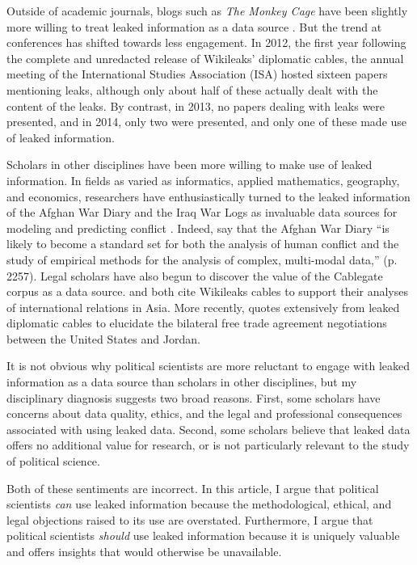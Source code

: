 \documentclass[12pt]{article}
\begin{document}
Outside of academic journals, blogs such as \textit{The Monkey Cage} have been slightly more willing 
to treat leaked information as a data source \citep{voeten2010wikileaks,michael2013united}.
But the trend at conferences has shifted towards less engagement. In 2012, the first year following the 
complete and unredacted release of Wikileaks' diplomatic cables, the annual meeting of the International Studies 
Association (ISA) hosted sixteen papers mentioning leaks, although only about half of these actually dealt 
with the content of the leaks. By contrast, in 2013, no papers dealing with leaks were presented, and in 2014, 
only two were presented, and only one of these made use of leaked information.

Scholars in other disciplines have been more willing to make use of leaked information. 
In fields as varied as informatics, applied mathematics, geography, and economics, researchers have 
enthusiastically turned to the leaked information of the Afghan War Diary and the Iraq War Logs 
as invaluable data sources for modeling and predicting conflict \citep{oloughlin2010peering,linke2012space-time,zammit-mangion2012point,cseke2013sparse,rusch2013model,
zammit-mangion2013modeling}.
Indeed, \citet{dedeo2013bootstrap} say that the Afghan War Diary ``is likely to become 
a standard set for both the analysis of human conflict and the study of empirical methods for the 
analysis of complex, multi-modal data,'' (p. 2257). Legal scholars have also begun to discover 
the value of the Cablegate corpus as a data source. \citet{khoo2011what} and \citet{mendis2012destiny} 
both cite Wikileaks cables to support their analyses of international relations in Asia. 
More recently, \citet{el_said2012morning} quotes extensively from 
leaked diplomatic cables to elucidate the bilateral free trade agreement negotiations between the United States 
and Jordan. 

It is not obvious why political scientists are more reluctant to engage with 
leaked information as a data source than scholars in other disciplines, but my disciplinary 
diagnosis suggests two broad reasons. First, some scholars have concerns about data quality, 
ethics, and the legal and professional consequences associated with using leaked data. 
Second, some scholars believe that leaked data offers no additional value for research, 
or is not particularly relevant to the study of political science.

Both of these sentiments are incorrect. 
In this article, I argue that political scientists \emph{can} use leaked information because 
the methodological, ethical, and legal objections raised to its use are overstated. 
Furthermore, I argue that political scientists \emph{should} use leaked information because it 
is uniquely valuable and offers insights that would otherwise be unavailable.
\end{document}
